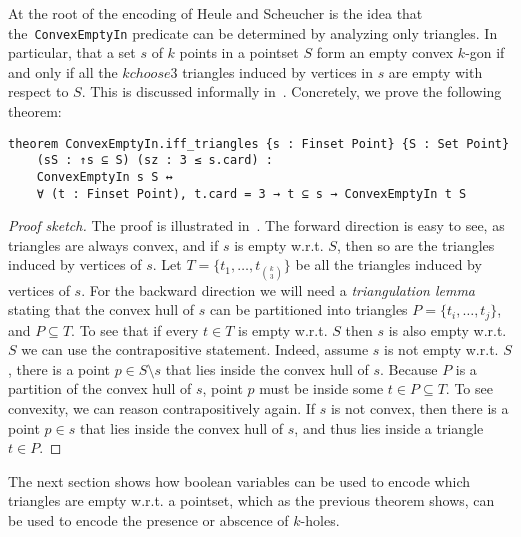 At the root  of the encoding of Heule and Scheucher is the idea that the~\lstinline|ConvexEmptyIn| predicate can be determined by analyzing only triangles. In particular, that a set $s$ of $k$ points in a pointset $S$ form an empty convex $k$-gon if and only if all the ${k choose 3}$ triangles induced by vertices in $s$ are empty with respect to $S$. This is discussed informally in~\cite[Section 3, Eq. 4]{emptyHexagonNumber}.
Concretely, we prove the following theorem:
\begin{lstlisting}
theorem ConvexEmptyIn.iff_triangles {s : Finset Point} {S : Set Point}
    (sS : ↑s ⊆ S) (sz : 3 ≤ s.card) :
    ConvexEmptyIn s S ↔ 
    ∀ (t : Finset Point), t.card = 3 → t ⊆ s → ConvexEmptyIn t S
\end{lstlisting}

\begin{proof}[Proof sketch]
    The proof is illustrated in~.
    The forward direction is easy to see, as triangles are always convex, and if $s$ is empty w.r.t. $S$, then so are the triangles induced by vertices of $s$.
    Let $T = \{t_1, \ldots, t_{{k \choose 3}}\}$ be all the triangles induced by vertices of $s$.
   For the backward direction we will need a \emph{triangulation lemma} stating that the convex hull of $s$ can be partitioned into triangles $P = \{t_i, \ldots, t_j\}$, and $P \subseteq T$.
    To see that if every $t \in T$ is empty w.r.t. $S$ then $s$ is also empty w.r.t. $S$ we can use the contrapositive statement.
     Indeed, assume $s$ is not empty w.r.t. $S$, there is a point $p \in S \setminus s$ that lies inside the convex hull of $s$. Because $P$ is a partition of the convex hull of $s$, point $p$ must be inside some $t \in P \subseteq T$. 
     To see convexity, we can reason contrapositively again. If $s$ is not convex, then there is a point $p \in s$ that lies inside the convex hull of $s$, and thus lies inside a triangle $t \in P$. 
\end{proof}

The next section shows how boolean variables can be used to encode which triangles are empty w.r.t. a pointset, which as the previous theorem shows, can be used to encode the presence or abscence of $k$-holes.




